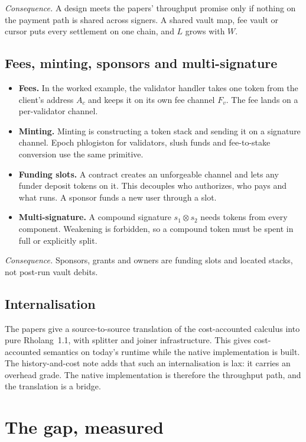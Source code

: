 \documentclass[11pt]{article}
\begin{document}
\emph{Consequence.} A design meets the papers' throughput promise only if nothing on the payment path is shared across signers. A shared vault map, fee vault or cursor puts every settlement on one chain, and $L$ grows with $W$.

\subsection{Fees, minting, sponsors and multi-signature}

\begin{itemize}
\item \textbf{Fees.} In the worked example, the validator handler takes one token from the client's address $A_c$ and keeps it on its own fee channel $F_v$. The fee lands on a per-validator channel.
\item \textbf{Minting.} Minting is constructing a token stack and sending it on a signature channel. Epoch phlogiston for validators, slush funds and fee-to-stake conversion use the same primitive.
\item \textbf{Funding slots.} A contract creates an unforgeable channel and lets any funder deposit tokens on it. This decouples who authorizes, who pays and what runs. A sponsor funds a new user through a slot.
\item \textbf{Multi-signature.} A compound signature $s_1 \otimes s_2$ needs tokens from every component. Weakening is forbidden, so a compound token must be spent in full or explicitly split.
\end{itemize}

\emph{Consequence.} Sponsors, grants and owners are funding slots and located stacks, not post-run vault debits.

\subsection{Internalisation}

The papers give a source-to-source translation of the cost-accounted calculus into pure Rholang~1.1, with splitter and joiner infrastructure. This gives cost-accounted semantics on today's runtime while the native implementation is built. The history-and-cost note adds that such an internalisation is lax: it carries an overhead grade. The native implementation is therefore the throughput path, and the translation is a bridge.

\section{The gap, measured}\label{sec:measured}
\end{document}
